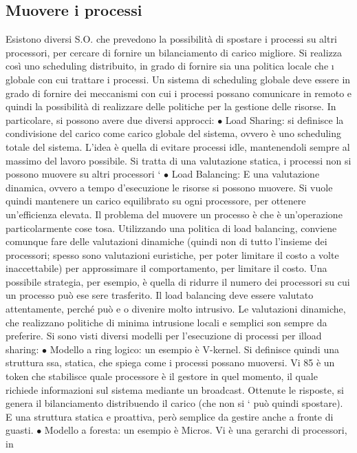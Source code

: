 \subsection{Muovere i processi}
Esistono diversi S.O. che prevedono la possibilità di spostare i processi su altri
processori, per cercare di fornire un bilanciamento di carico migliore. Si realizza
così uno scheduling distribuito, in grado di fornire sia una politica locale che
\i{}
globale con cui trattare i processi. Un sistema di scheduling globale deve essere
in grado di fornire dei meccanismi con cui i processi possano comunicare in
remoto e quindi la possibilità di realizzare delle politiche per la gestione delle
risorse.
In particolare, si possono avere due diversi approcci:
$\bullet$ Load Sharing: si definisce la condivisione del carico come carico globale
del sistema, ovvero è uno scheduling totale del sistema. L'idea è quella di
evitare processi idle, mantenendoli sempre al massimo del lavoro possibile.
Si tratta di una valutazione statica, i processi non si possono muovere su
altri processori
`
$\bullet$ Load Balancing: E una valutazione dinamica, ovvero a tempo d'esecuzione
le risorse si possono muovere. Si vuole quindi mantenere un carico equilibrato su ogni processore, per ottenere
un'efficienza elevata.
Il problema del muovere un processo è che è un'operazione particolarmente cose
tosa. Utilizzando una politica di load balancing, conviene comunque fare delle
valutazioni dinamiche (quindi non di tutto l'insieme dei processori; spesso sono
valutazioni euristiche, per poter limitare il costo a volte inaccettabile) per approssimare il comportamento, per
limitare il costo. Una possibile strategia, per
esempio, è quella di ridurre il numero dei processori su cui un processo può ese
sere trasferito. Il load balancing deve essere valutato attentamente, perché può
e o
divenire molto intrusivo. Le valutazioni dinamiche, che realizzano politiche di
minima intrusione locali e semplici son sempre da preferire.
Si sono visti diversi modelli per l'esecuzione di processi per ilload sharing:
$\bullet$ Modello a ring logico: un esempio è V-kernel. Si definisce quindi una
struttura ssa, statica, che spiega come i processi possano muoversi. Vi
85
è un token che stabilisce quale processore è il gestore in quel momento, il
quale richiede informazioni sul sistema mediante un broadcast. Ottenute
le risposte, si genera il bilanciamento distribuendo il carico (che non si
`
può quindi spostare). E una struttura statica e proattiva, però semplice
da gestire anche a fronte di guasti.
$\bullet$ Modello a foresta: un esempio è Micros. Vi è una gerarchi di processori, in
